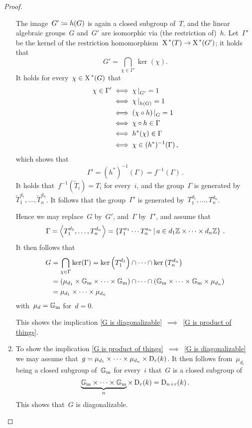 \begin{proof}
\begin{enumerate}[label = Step~\arabic*]
      The image~$G' \coloneqq h(G)$ is again a closed subgroup of~$T$, and the linear algebraic groups~$G$ and~$G'$ are isomorphic via (the restriction of)~$h$.
      Let~$\Gamma'$ be the kernel of the restriction homomorphism~$\operatorname{X}^{\,*}(T) \to \operatorname{X}^{\,*}(G')$;
      it holds that
      \[
          G'
        = \bigcap_{\chi \in \Gamma'} \ker(\chi).
      \]
      It holds for every~$\chi \in \operatorname{X}^{\,*}(G)$ that
      \begin{align*}
                \chi \in \Gamma'
        \iff{}& \restrict{\chi}{G'} = 1 \\
        \iff{}& \restrict{\chi}{h(G)} = 1 \\
        \iff{}& \restrict{(\chi \circ h)}{G} = 1  \\
        \iff{}& \chi \circ h \in \Gamma \\
        \iff{}& h^*(\chi) \in \Gamma  \\
        \iff{}& \chi \in (h^*)^{-1}(\Gamma) \,,
      \end{align*}
      which shows that
      \[
          \Gamma'
        = (h^*)^{-1}(\Gamma)
        = f^{-1}(\Gamma) \,.
      \]
      It holds that~$f^{-1}( \tilde{T}_i ) = T_i$ for every~$i$, and the group~$\Gamma$ is generated by~$\tilde{T}_1^{d_1}, \dotsc, \tilde{T}_n^{d_n}$.
      It follows that the group~$\Gamma'$ is generated by~$T_1^{d_1}, \dotsc, T_n^{d_n}$.
      
      Hence we may replace~$G$ by~$G'$, and~$\Gamma$ by~$\Gamma'$, and assume that
      \[
          \Gamma
        = \gen*{ T_1^{d_1}, \dotsc, T_n^{d_n} }
        = \left\{
            T_1^{a_1} \dotsm T_n^{a_n}
          \suchthat*
            \mindex{a} \in d_1 \Integer \times \dotsb \times d_n \Integer
          \right\} \,.
      \]
      It then follows that
      \begin{align*}
            G 
        &=  \bigcap_{\chi \in \Gamma} \ker(\Gamma)
         =  \ker\left( T_1^{d_1} \right)
            \cap \dotsb \cap
            \ker\left( T_n^{d_n} \right)  \\
        &=  ( \mu_{d_1} \times \mathbb{G}_{\text{m}} \times \dotsb \times \mathbb{G}_{\text{m}} )
            \cap \dotsb \cap
            ( \mathbb{G}_{\text{m}} \times \dotsb \times \mathbb{G}_{\text{m}} \times \mu_{d_n} ) \\
        &=  \mu_{d_1} \times \dotsb \times \mu_{d_n}
      \end{align*}
      with~$\mu_d = \mathbb{G}_{\text{m}}$ for~$d = 0$.
      
      This shows the implication \ref*{G is diagonalizable}~$\implies$~\ref*{G is product of things}.
      
  \item
      To show the implication \ref*{G is product of things}~$\implies$~\ref*{G is diagonalizable} we may assume that~$g = \mu_{d_1} \times \dotsb \times \mu_{d_n} \times \operatorname{D}_r(k)$.
      It then follows from~$\mu_{d_i}$ being a closed subgroup of~$\mathbb{G}_{\text{m}}$ for every~$i$ that~$G$ is a closed subgroup of
      \[
          \underbrace{\mathbb{G}_{\text{m}} \times \dotsb \times \mathbb{G}_{\text{m}}}_{n} \times \operatorname{D}_r(k)
        = \operatorname{D}_{n+r}(k) \,.
      \]
      This shows that~$G$ is diagonalizable.
     \qedhere
  \end{enumerate}
\end{proof}
